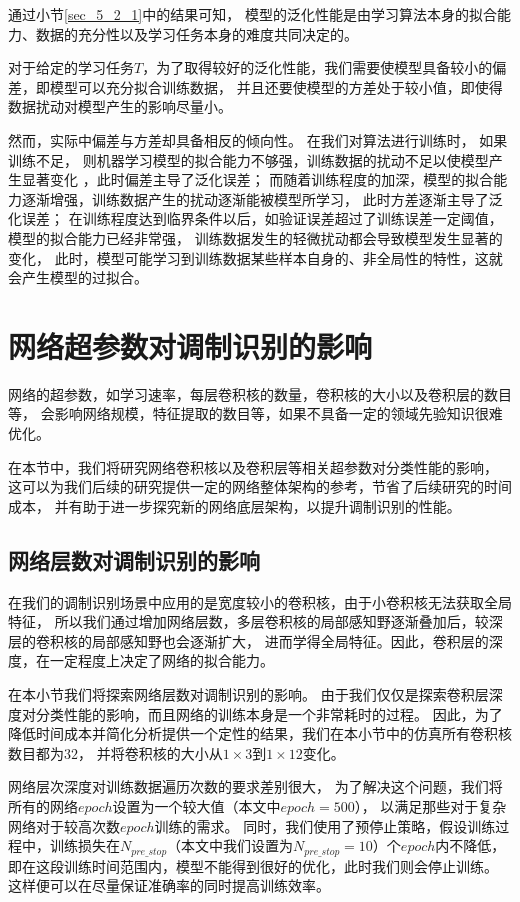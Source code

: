 通过小节\ref{sec_5_2_1}中的结果可知，
模型的泛化性能是由学习算法本身的拟合能力、数据的充分性以及学习任务本身的难度共同决定的。

对于给定的学习任务$T$，为了取得较好的泛化性能，我们需要使模型具备较小的偏差，即模型可以充分拟合训练数据，
并且还要使模型的方差处于较小值，即使得数据扰动对模型产生的影响尽量小。\par

然而，实际中偏差与方差却具备相反的倾向性。
在我们对算法进行训练时，
如果训练不足， 则机器学习模型的拟合能力不够强，训练数据的扰动不足以使模型产生显著变化
，此时偏差主导了泛化误差；
而随着训练程度的加深，模型的拟合能力逐渐增强，训练数据产生的扰动逐渐能被模型所学习，
此时方差逐渐主导了泛化误差；
在训练程度达到临界条件以后，如验证误差超过了训练误差一定阈值，模型的拟合能力已经非常强，
训练数据发生的轻微扰动都会导致模型发生显著的变化，
此时，模型可能学习到训练数据某些样本自身的、非全局性的特性，这就会产生模型的过拟合。\par

\section{网络超参数对调制识别的影响}
网络的超参数，如学习速率，每层卷积核的数量，卷积核的大小以及卷积层的数目等，
会影响网络规模，特征提取的数目等，如果不具备一定的领域先验知识很难优化。\par

在本节中，我们将研究网络卷积核以及卷积层等相关超参数对分类性能的影响，
这可以为我们后续的研究提供一定的网络整体架构的参考，节省了后续研究的时间成本，
并有助于进一步探究新的网络底层架构，以提升调制识别的性能。\par

\subsection{网络层数对调制识别的影响}
在我们的调制识别场景中应用的是宽度较小的卷积核，由于小卷积核无法获取全局特征，
所以我们通过增加网络层数，多层卷积核的局部感知野逐渐叠加后，较深层的卷积核的局部感知野也会逐渐扩大，
进而学得全局特征。因此，卷积层的深度，在一定程度上决定了网络的拟合能力。\par

在本小节我们将探索网络层数对调制识别的影响。
由于我们仅仅是探索卷积层深度对分类性能的影响，而且网络的训练本身是一个非常耗时的过程。
因此，为了降低时间成本并简化分析提供一个定性的结果，我们在本小节中的仿真所有卷积核数目都为$32$，
并将卷积核的大小从$1\times3$到$1\times12$变化。\par
网络层次深度对训练数据遍历次数的要求差别很大，
为了解决这个问题，我们将所有的网络$epoch$设置为一个较大值（本文中$epoch=500$），
以满足那些对于复杂网络对于较高次数$epoch$训练的需求。
同时，我们使用了预停止策略，假设训练过程中，训练损失在$N_{pre\_stop}$（本文中我们设置为$N_{pre\_stop}=10$）个$epoch$内不降低，
即在这段训练时间范围内，模型不能得到很好的优化，此时我们则会停止训练。
这样便可以在尽量保证准确率的同时提高训练效率。\par

